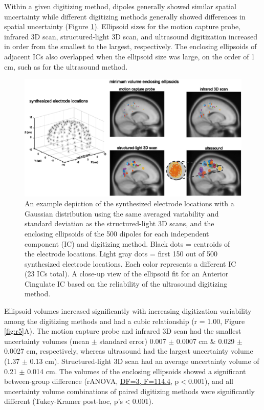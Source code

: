 \documentclass[../thesis_seyed.tex]{subfiles}
\begin{document}
Within a given digitizing method, dipoles generally showed similar spatial uncertainty while different digitizing methods generally showed differences in spatial uncertainty (Figure \ref{fig:r4}). Ellipsoid sizes for the motion capture probe, infrared 3D scan, structured-light 3D scan, and ultrasound digitization increased in order from the smallest to the largest, respectively. The enclosing ellipsoids of adjacent ICs also overlapped when the ellipsoid size was large, on the order of 1 cm, such as for the ultrasound method. 

\begin{figure}[H]
    \centering
    \includegraphics[width=\linewidth]{../img/result4.eps}
    \caption{An example depiction of the synthesized electrode locations with a Gaussian distribution using the same averaged variability and standard deviation as the structured-light 3D scans, and the enclosing ellipsoids of the 500 dipoles for each independent component (IC) and digitizing method. Black dots = centroids of the electrode locations. Light gray dots = first 150 out of 500 synthesized electrode locations. Each color represents a different IC (23 ICs total). A close-up view of the ellipsoid fit for an Anterior Cingulate IC based on the reliability of the ultrasound digitizing method.}
    \label{fig:r4}
\end{figure}

Ellipsoid volumes increased significantly with increasing digitization variability among the digitizing methods and had a cubic relationship (r = 1.00, Figure \ref{fig:r5}A). The motion capture probe and infrared 3D scan had the smallest uncertainty volumes (mean $\pm$ standard error) 0.007 $\pm$ 0.0007 cm \& 0.029 $\pm$ 0.0027 cm, respectively, whereas ultrasound had the largest uncertainty volume (1.37 $\pm$ 0.13 cm). Structured-light 3D scan had an average uncertainty volume of 0.21 $\pm$ 0.014 cm. The volumes of the enclosing ellipsoids showed a significant between-group difference (rANOVA, \ul{DF=3, F=114.4,} p$<$0.001), and all uncertainty volume combinations of paired digitizing methods were significantly different (Tukey-Kramer post-hoc, p's$<$0.001). 
\end{document}
